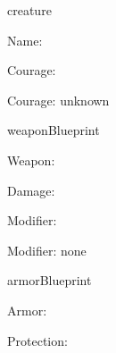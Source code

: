 \documentclass[12pt]{pnpprep}
\begin{document}
\begin{blueprint}{creature}


    \begin{render}
        \begin{panel}{\namevalue}
            Name: \namevalue
            \par

                {Courage: \couragevalue}

                {Courage: unknown}

            \par

            \renderChildren
        \end{panel}
    \end{render}
\end{blueprint}


\begin{blueprint}{weaponBlueprint}

    \begin{render}
        Weapon: \namevalue
        \par
        Damage: \damagevalue
        \par

            {Modifier: \modifiervalue}

            {Modifier: none}

        \par
    \end{render}
\end{blueprint}


\begin{blueprint}{armorBlueprint}

    \begin{render}
        Armor: \namevalue
        \par
        Protection: \protectionvalue
        \par
    \end{render}
\end{blueprint}


\begin{creature}

    \begin{weapon}
    \end{weapon}

    \begin{armor}
    \end{armor}
\end{creature}
\end{document}
